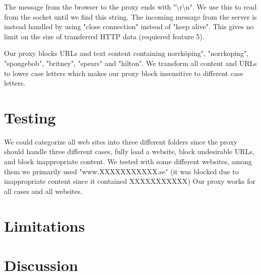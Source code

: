 \documentclass[10pt]{article}
\begin{document}
The message from the browser to the proxy ends with
"\textbackslash r\textbackslash n". We use this to read from the socket until
we find this string. The incoming message from the server is instead handled by
using "close connection" instead of "keep alive". This gives no limit on the
size of transferred HTTP data (requiered feature 5).

Our proxy blocks URLs and text content containing norrköping", "norrkoping",
"spongebob", "britney", "spears" and "hilton". We transform all content and
URLs to lower case letters which makes our proxy block insensitive to different
case letters.

\section{Testing}
We could categorize all web sites into three different folders since the
proxy should handle three different cases, fully load a website,
block undesirable URLs, and block inappropriate content. We tested with some
different websites, among them we primarily used "www.XXXXXXXXXXX.se"
(it was blocked due to inappropriate content since it contained XXXXXXXXXXX)
Our proxy works for all cases and all websites.

\section{Limitations}

\section{Discussion}
\end{document}
